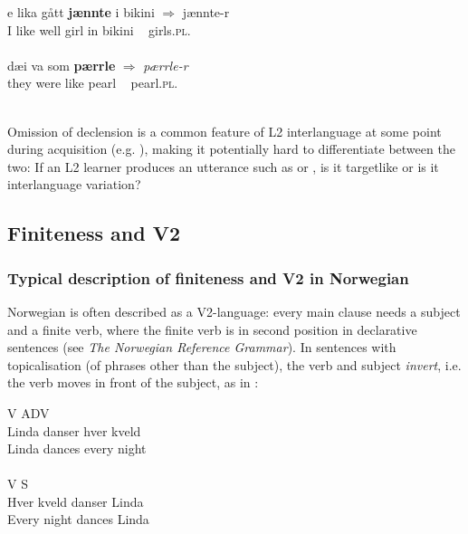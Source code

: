 \documentclass[output=paper,colorlinks,citecolor=brown,modfonts,nonflat]{../langscibook}
\begin{document}
\ea%
    \label{ex:emilsen:7}
\gll e lika gått \textbf{jænnte}  i bikini ${\Rightarrow}$  {jænnte-r} \\
 I like well girl  in bikini ~ girls.\textsc{pl}. \\
   \\

\ex%
    \label{ex:emilsen:8}
\gll dæi va som \textbf{pærrle} ${\Rightarrow}$ \textit{pærrle-r} \\
 they were like pearl ~ pearl.\textsc{pl}. \\
    \\
\z

Omission of declension is a common feature of L2 interlanguage at some point during acquisition (e.g. \citealt{White2003, Trenkic2007, Trenkic2009, GoadWhite2009, EmilsenSøfteland2018, Emilsen2019}), making it potentially hard to differentiate between the two: If an L2 learner produces an utterance such as  or , is it targetlike or is it interlanguage variation?

\subsection{Finiteness and V2}\label{sec:emilsen:3.2}%
\subsubsection{Typical description of finiteness and V2 in Norwegian}%

Norwegian is often described as a V2-language: every main clause needs a subject and a finite verb, where the finite verb is in second position in declarative sentences (see \textit{The Norwegian Reference Grammar}). In sentences with topicalisation (of phrases other than the subject), the verb and subject \textit{invert}, i.e. the verb moves in front of the subject, as in :


\ea\label{ex:emilsen:9}
\ea\label{ex:emilsen:9a}
 {V} {ADV}\\
Linda danser hver kveld\\
 Linda dances every night\\
 \\
\ex\label{ex:emilsen:9b}
 {V} {S}\\
 Hver kveld danser Linda\\
 Every night dances Linda\\
 \\
\z
\z
\end{document}
